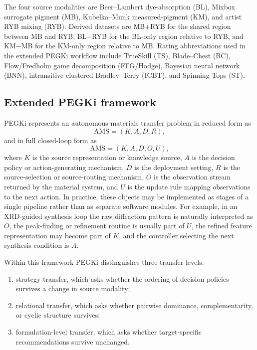 \documentclass[twoside,twocolumn,9pt]{article}
\begin{document}
The four source modalities are Beer--Lambert dye-absorption (BL), Mixbox surrogate pigment (MB), Kubelka--Munk measured-pigment (KM), and artist RYB mixing (RYB).\cite{Kubelka1931,Sochorova2021,Gossett2004RYB,Wiersma2025Hyperspectral} Derived datasets are MB+RYB for the shared region between MB and RYB, BL$-$RYB for the BL-only region relative to RYB, and KM$-$MB for the KM-only region relative to MB. Rating abbreviations used in the extended PEGKi workflow include TrueSkill (TS), Blade--Chest (BC), Flow/Fredholm game decomposition (FFG/Hodge), Bayesian neural network (BNN), intransitive clustered Bradley--Terry (ICBT), and Spinning Tops (ST).\cite{Herbrich2006TrueSkill,ChenJoachims2016Intransitivity,Wellman2006EGTA,Czarnecki2020SpinningTop}

\subsection{Extended PEGKi framework}

PEGKi represents an autonomous-materials transfer problem in reduced form as
\[
\mathrm{AMS}=(K,A,D,R),
\]
and in full closed-loop form as
\[
\mathrm{AMS}=(K,A,D,O,U),
\]
where $K$ is the source representation or knowledge source, $A$ is the decision policy or action-generating mechanism, $D$ is the deployment setting, $R$ is the source-selection or source-routing mechanism, $O$ is the observation stream returned by the material system, and $U$ is the update rule mapping observations to the next action. In practice, these objects may be implemented as stages of a single pipeline rather than as separate software modules. For example, in an XRD-guided synthesis loop the raw diffraction pattern is naturally interpreted as $O$, the peak-finding or refinement routine is usually part of $U$, the refined feature representation may become part of $K$, and the controller selecting the next synthesis condition is $A$.

Within this framework PEGKi distinguishes three transfer levels:
\begin{enumerate}
\item strategy transfer, which asks whether the ordering of decision policies survives a change in source modality;
\item relational transfer, which asks whether pairwise dominance, complementarity, or cyclic structure survives;
\item formulation-level transfer, which asks whether target-specific recommendations survive unchanged.
\end{enumerate}
\end{document}

